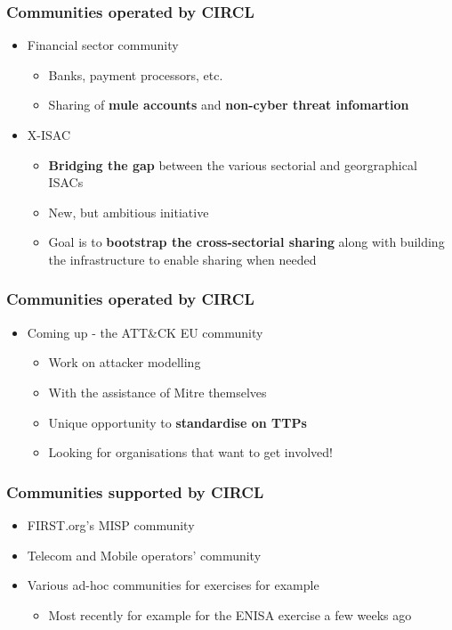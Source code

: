 \begin{frame}
\frametitle{Communities operated by CIRCL}
\begin{itemize}
	\item Financial sector community
	\begin{itemize}
		\item Banks, payment processors, etc.
		\item Sharing of {\bf mule accounts} and {\bf non-cyber threat infomartion}
	\end{itemize}
	\item X-ISAC
	\begin{itemize}
		\item {\bf Bridging the gap} between the various sectorial and georgraphical ISACs
		\item New, but ambitious initiative
		\item Goal is to {\bf bootstrap the cross-sectorial sharing} along with building the infrastructure to enable sharing when needed
	\end{itemize}
\end{itemize}
\end{frame}

\begin{frame}
\frametitle{Communities operated by CIRCL}
\begin{itemize}
	\item Coming up - the ATT\&CK EU community
	\begin{itemize}
		\item Work on attacker modelling
		\item With the assistance of Mitre themselves
		\item Unique opportunity to {\bf standardise on TTPs}
		\item Looking for organisations that want to get involved!
	\end{itemize}
\end{itemize}
\end{frame}

\begin{frame}
\frametitle{Communities supported by CIRCL}
\begin{itemize}
	\item FIRST.org's MISP community
	\item Telecom and Mobile operators' community
	\item Various ad-hoc communities for exercises for example
	\begin{itemize}
		\item Most recently for example for the ENISA exercise a few weeks ago
	\end{itemize}
\end{itemize}
\end{frame}

